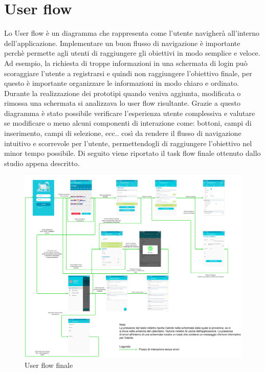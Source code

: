 \documentclass[12pt]{report}
\begin{document}
\section{User flow}
Lo User flow è un diagramma che rappresenta come l'utente navigherà all'interno dell'applicazione. Implementare un buon flusso di navigazione è importante perchè permette agli utenti di raggiungere gli obiettivi in modo semplice e veloce. Ad esempio, la richiesta di troppe informazioni in una schermata di login può scoraggiare l'utente a registrarsi e quindi non raggiungere l'obiettivo finale, per questo è importante organizzare le informazioni in modo chiaro e ordinato.\\
Durante la realizzazione dei prototipi quando veniva aggiunta, modificata o rimossa una schermata si analizzava lo user flow risultante. Grazie a questo diagramma è stato possibile verificare l'esperienza utente complessiva e valutare se modificare o meno alcuni componenti di interazione come: bottoni, campi di inserimento, campi di selezione, ecc.. così da rendere il flusso di navigazione intuitivo e scorrevole per l'utente, permettendogli di raggiungere l'obiettivo nel minor tempo possibile. Di seguito viene riportato il task flow finale ottenuto dallo studio appena descritto.

\begin{figure}[h!]
	\centering
	\includegraphics[width=1.1\linewidth]{immagini/UserFlow}
	\caption{User flow finale}
\end{figure}
\newpage
\end{document}
